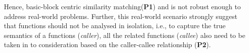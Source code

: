 Hence, basic-block centric  
similarity matching(\textbf{P1}) and  is not robust enough to address real-world problems. Further, this real-world scenario strongly suggest that functions should not be analysed in isolation, i.e., to capture the true semantics of a functions (\textit{caller}), all the related functions (\textit{callee}) also need to be taken in to consideration based on the caller-callee relationship (\textbf{P2}).

%








